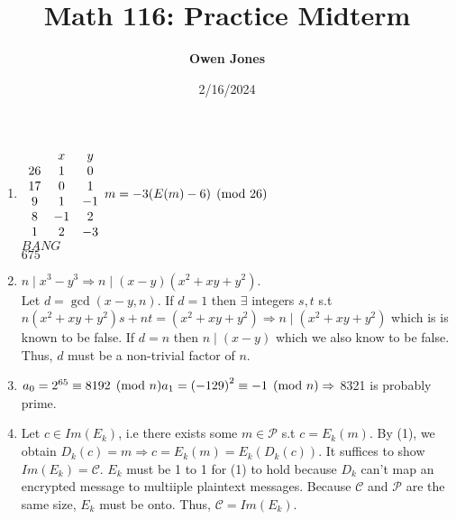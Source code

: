 \documentclass[10pt]{article}
\title{\bf Math 116: Practice Midterm}
\date{2/16/2024}
\author{\bf Owen Jones}
\begin{document}
\maketitle
\begin{enumerate}[label=\arabic*.]
    \item $\begin{array}{c c c}
        & x & y\\
        26 & 1 & 0\\
        17 & 0 & 1\\
        9 & 1 & -1\\
        8 & -1 & 2\\
        1 & 2 & -3
    \end{array}\\
    m = -3(E(m)-6)\pmod{26}$\\
    $BANG$\\
    $675$
    \item $n\mid x^3-y^3\Rightarrow n\mid (x-y)(x^2+xy+y^2)$.\\
    Let $d=\gcd(x-y,n)$. If $d=1$ then $\exists$ integers $s,t$ s.t $n(x^2+xy+y^2)s+nt=(x^2+xy+y^2)\Rightarrow n\mid (x^2+xy+y^2)$ which is is known to be false.
    If $d=n$ then $n\mid (x-y)$ which we also know to be false. Thus, $d$ must be a non-trivial factor of $n$.
    \item $a_0=2^{65}\equiv 8192\pmod{n}\\
    a_1={(-129)}^2\equiv -1\pmod{n}\\
    \Rightarrow$ 8321 is probably prime.\\
    \item Let $c\in Im(E_k)$, i.e there exists some $m\in \mathcal{P}$ s.t $c=E_k(m)$.
    By (1), we obtain $D_k(c)=m\Rightarrow c=E_k(m)=E_k(D_k(c))$. 
    It suffices to show $Im(E_k)=\mathcal{C}$. 
    $E_k$ must be 1 to 1 for (1) to hold because $D_k$ can't map an encrypted message to multiiple plaintext messages. 
    Because $\mathcal{C}$ and $\mathcal{P}$ are the same size, $E_k$ must be onto. Thus, $\mathcal{C}=Im(E_k)$.
\end{enumerate}
\end{document}
